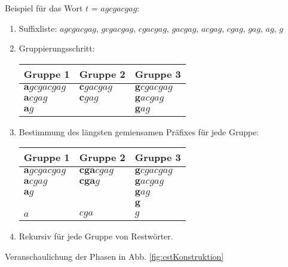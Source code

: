 \documentclass[12pt]{report}
\begin{document}
Beispiel für das Wort $t$ = $agcgacgag$:
\begin{enumerate}
    \item Suffixliste: $agcgacgag$, $gcgacgag$, $cgacgag$, $gacgag$, $acgag$, $cgag$, $gag$, $ag$, $g$
    \item Gruppierungsschritt:
        \begin{center}
        \begin{tabular}{l l l}
            \toprule
            Gruppe 1                 & Gruppe 2               & Gruppe 3                \\
            \midrule
            $\boldsymbol{a}gcgacgag$ & $\boldsymbol{c}gacgag$ & $\boldsymbol{g}cgacgag$ \\
            $\boldsymbol{a}cgag$     & $\boldsymbol{c}gag$    & $\boldsymbol{g}acgag$   \\
            $\boldsymbol{a}g$        &                        & $\boldsymbol{g}ag$      \\
            \bottomrule
        \end{tabular}
        \end{center}
    \item Bestimmung des längsten gemiensamen Präfixes für jede Gruppe:
        \begin{center}
        \begin{tabular}{l l l}
            \toprule
            Gruppe 1                 & Gruppe 2               & Gruppe 3                \\
            \midrule
            $\boldsymbol{a}gcgacgag$ & $\boldsymbol{cga}cgag$ & $\boldsymbol{g}cgacgag$ \\
            $\boldsymbol{a}cgag$     & $\boldsymbol{cga}g$    & $\boldsymbol{g}acgag$   \\
            $\boldsymbol{a}g$        &                        & $\boldsymbol{g}ag$      \\
                                     &                        & $\boldsymbol{g}$        \\
            \midrule
            $a$                      & $cga$                  & $g$                     \\
            \bottomrule
        \end{tabular}
        \end{center}
    \item Rekursiv für jede Gruppe von Restwörter.
\end{enumerate}

Veranschaulichung der Phasen in Abb. \ref{fig:cstKonstruktion}
\end{document}
